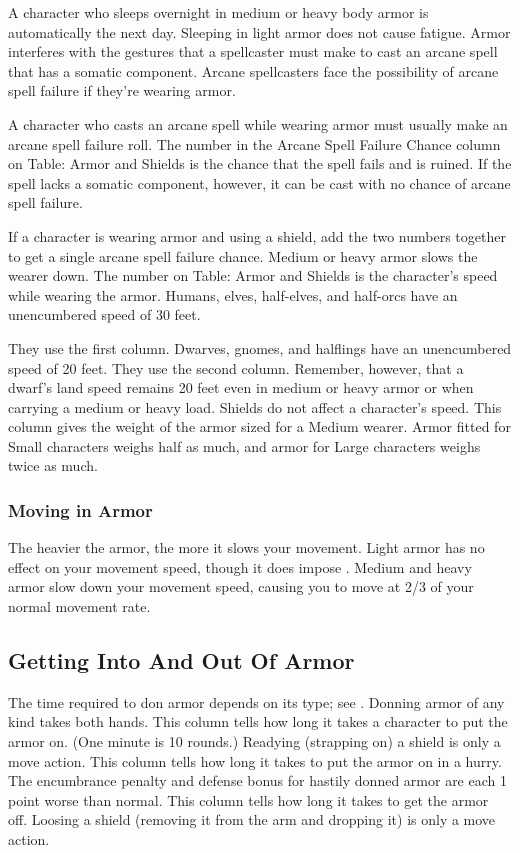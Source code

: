  A character who sleeps overnight in medium or heavy body armor is automatically \fatigued the next day. Sleeping in light armor does not cause fatigue.
 Armor interferes with the gestures that a spellcaster must make to cast an arcane spell that has a somatic component. Arcane spellcasters face the possibility of arcane spell failure if they're wearing armor.

 A character who casts an arcane spell while wearing armor must usually make an arcane spell failure roll. The number in the Arcane Spell Failure Chance column on Table: Armor and Shields is the chance that the spell fails and is ruined. If the spell lacks a somatic component, however, it can be cast with no chance of arcane spell failure.

 If a character is wearing armor and using a shield, add the two numbers together to get a single arcane spell failure chance.
 Medium or heavy armor slows the wearer down. The number on Table: Armor and Shields is the character's speed while wearing the armor. Humans, elves, half-elves, and half-orcs have an unencumbered speed of 30 feet.
\par They use the first column. Dwarves, gnomes, and halflings have an unencumbered speed of 20 feet. They use the second column. Remember, however, that a dwarf's land speed remains 20 feet even in medium or heavy armor or when carrying a medium or heavy load.
 Shields do not affect a character's speed.
 This column gives the weight of the armor sized for a Medium wearer. Armor fitted for Small characters weighs half as much, and armor for Large characters weighs twice as much.

\subsubsection{Moving in Armor}
    The heavier the armor, the more it slows your movement. Light armor has no effect on your movement speed, though it does impose . Medium and heavy armor slow down your movement speed, causing you to move at 2/3 of your normal movement rate.

\subsection{Getting Into And Out Of Armor}
The time required to don armor depends on its type; see . Donning armor of any kind takes both hands.
 This column tells how long it takes a character to put the armor on. (One minute is 10 rounds.) Readying (strapping on) a shield is only a move action.
 This column tells how long it takes to put the armor on in a hurry. The encumbrance penalty and defense bonus for hastily donned armor are each 1 point worse than normal.
 This column tells how long it takes to get the armor off. Loosing a shield (removing it from the arm and dropping it) is only a move action.

